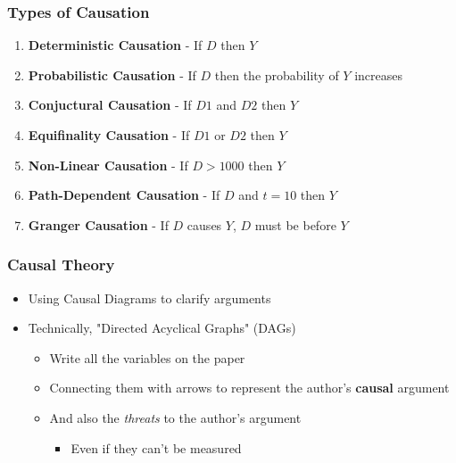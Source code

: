\documentclass[xcolor=x11names,compress]{beamer}\usepackage[]{graphicx}\usepackage[]{color}
\renewcommand{\(}{\begin{columns}}
\renewcommand{\)}{\end{columns}}
\newcommand{\<}[1]{\begin{column}{#1}}
\renewcommand{\>}{\end{column}}
\begin{document}
\begin{frame}
\frametitle{Types of Causation}
\begin{enumerate}
\item \textbf{Deterministic Causation} - If $D$ then $Y$
\pause
\item \textbf{Probabilistic Causation} - If $D$ then the probability of $Y$ increases
\pause
\item \textbf{Conjuctural Causation} - If $D1$ and $D2$ then $Y$
\pause
\item \textbf{Equifinality Causation} - If $D1$ or $D2$ then $Y$
\pause
\item \textbf{Non-Linear Causation} - If $D>1000$ then $Y$
\pause
\item \textbf{Path-Dependent Causation} - If $D$ and $t=10$ then $Y$
\pause
\item \textbf{Granger Causation} - If $D$ causes $Y$, $D$ must be before $Y$
\end{enumerate}
\end{frame}

\begin{frame}
\frametitle{Causal Theory}
\begin{itemize}
\item Using Causal Diagrams to clarify arguments
\pause
\item Technically, "Directed Acyclical Graphs" (DAGs)
\pause
\begin{itemize}
\item Write all the variables on the paper
\pause
\item Connecting them with arrows to represent the author's \textbf{causal} argument
\pause
\item And also the \textit{threats} to the author's argument
\begin{itemize}
\item Even if they can't be measured
\end{itemize}
\end{itemize}
\end{itemize}
\end{frame}
\end{document}
